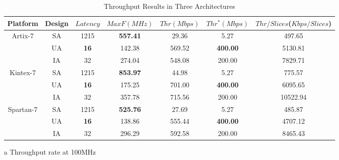 \documentclass[final,5p,times,twocolumn]{elsarticle}
\begin{document}
\begin{table}
    \begin{threeparttable}
        \caption{Throughput Results in Three Architectures}\label{throughput_compare}%
        \begin{tabular*}{\textwidth}{@{\extracolsep\fill}|c|c|c|c|c|c|c|}
            \hline
            Platform & Design & $Latency$ & $MaxF(MHz)$ & $Thr(Mbps)$ & $Thr^*(Mbps)$\tnote{a} & $Thr/Slices$($Kbps/Slices$) \\
            \hline
            \multirow{3}{*}{Artix-7}  & SA & 1215 & \textbf{557.41} & 29.36 & 5.27 & 497.65 \\
            & UA & \textbf{16} & 142.38 & 569.52 & \textbf{400.00} & 5130.81 \\
            & IA & 32 & 274.04 & 548.08 & 200.00 & 7829.71 \\
            \hline
            \multirow{3}{*}{Kintex-7} & SA & 1215 & \textbf{853.97} & 44.98 & 5.27 & 775.57 \\
            & UA & \textbf{16} & 175.25 & 701.00 & \textbf{400.00} & 6095.65 \\
            & IA & 32 & 357.78 & 715.56 & 200.00 & 10522.94 \\
            \hline
            \multirow{3}{*}{Spartan-7} & SA & 1215 & \textbf{525.76} & 27.69 & 5.27 & 485.87 \\
            & UA & \textbf{16} & 138.86 & 555.44 & \textbf{400.00} & 4707.12 \\
            & IA & 32 & 296.29 & 592.58 & 200.00 & 8465.43 \\
            \hline
        \end{tabular*}
        \begin{tablenotes}
            \item[a] Throughput rate at 100MHz
        \end{tablenotes}
    \end{threeparttable}
\end{table}
\end{document}
